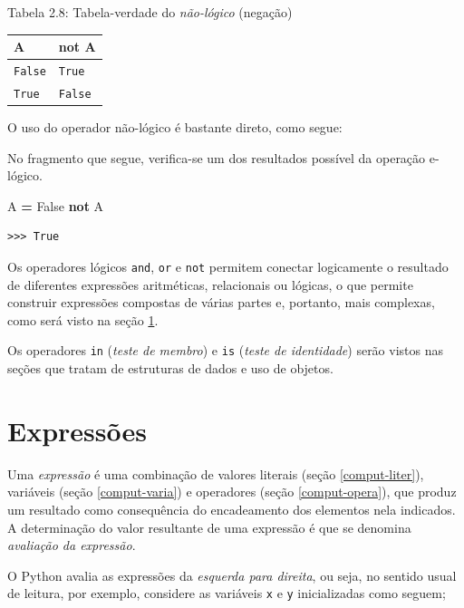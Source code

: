 \documentclass[
]{book}
\newenvironment{Shaded}{\begin{snugshade}}{\end{snugshade}}
\newcommand{\KeywordTok}[1]{\textcolor[rgb]{0.13,0.29,0.53}{\textbf{#1}}}
\newcommand{\NormalTok}[1]{#1}
\newcommand{\OperatorTok}[1]{\textcolor[rgb]{0.81,0.36,0.00}{\textbf{#1}}}
\newcommand{\VariableTok}[1]{\textcolor[rgb]{0.00,0.00,0.00}{#1}}
\begin{document}
Tabela 2.8: Tabela-verdade do \emph{não-lógico} (negação)

\begin{longtable}[]{@{}ll@{}}
\toprule
A & not A \\
\midrule
\endhead
\texttt{False} & \texttt{True} \\
\texttt{True} & \texttt{False} \\
\bottomrule
\end{longtable}

O uso do operador não-lógico é bastante direto, como segue:

No fragmento que segue, verifica-se um dos resultados possível da operação e-lógico.

\begin{Shaded}
\begin{Highlighting}[]
\NormalTok{A }\OperatorTok{=} \VariableTok{False}
\KeywordTok{not}\NormalTok{ A}
\end{Highlighting}
\end{Shaded}

\begin{verbatim}
>>> True
\end{verbatim}

Os operadores lógicos \texttt{and}, \texttt{or} e \texttt{not} permitem conectar logicamente o resultado de diferentes expressões aritméticas, relacionais ou lógicas, o que permite construir expressões compostas de várias partes e, portanto, mais complexas, como será visto na seção \ref{comput-expre}.

Os operadores \texttt{in} (\emph{teste de membro}) e \texttt{is} (\emph{teste de identidade}) serão vistos nas seções que tratam de estruturas de dados e uso de objetos.

\hypertarget{comput-expre}{%
\section{Expressões}\label{comput-expre}}

Uma \emph{expressão} é uma combinação de valores literais (seção \ref{comput-liter}), variáveis (seção \ref{comput-varia}) e operadores (seção \ref{comput-opera}), que produz um resultado como consequência do encadeamento dos elementos nela indicados. A determinação do valor resultante de uma expressão é que se denomina \emph{avaliação da expressão}.

O Python avalia as expressões da \emph{esquerda para direita}, ou seja, no sentido usual de leitura, por exemplo, considere as variáveis \texttt{x} e \texttt{y} inicializadas como seguem;
\end{document}
